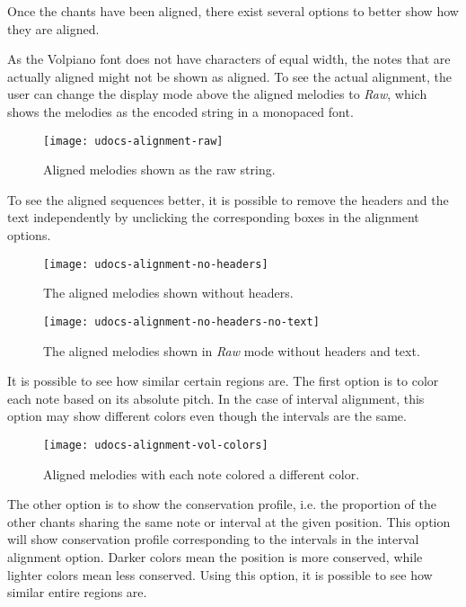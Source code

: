 Once the chants have been aligned, there exist several options to better show how they are aligned.

As the Volpiano font does not have characters of equal width, the notes that are actually aligned might not be shown as aligned. To see the
actual alignment, the user can change the display mode above the aligned melodies to \emph{Raw}, which shows the melodies as the encoded string
in a monopaced font.

\begin{figure}[h]
\centering
\texttt{[image: udocs-alignment-raw]}
\caption{Aligned melodies shown as the raw string.}
\label{fig:align-raw}
\end{figure}

To see the aligned sequences better, it is possible to remove the headers and the text independently by unclicking the corresponding boxes
in the alignment options.

\begin{figure}[h]
\centering
\texttt{[image: udocs-alignment-no-headers]}
\caption{The aligned melodies shown without headers.}
\label{fig:align-no-headers}
\end{figure}

\begin{figure}[h]
\centering
\texttt{[image: udocs-alignment-no-headers-no-text]}
\caption{The aligned melodies shown in \emph{Raw} mode without headers and text.}
\label{fig:align-no-text}
\end{figure}

It is possible to see how similar certain regions are. The first option is to color each note based on its absolute pitch. In the case of interval alignment,
this option may show different colors even though the intervals are the same.

\begin{figure}[h]
\centering
\texttt{[image: udocs-alignment-vol-colors]}
\caption{Aligned melodies with each note colored a different color.}
\label{fig:align-colors}
\end{figure}

The other option is to show the conservation profile, i.e. the proportion of the other chants sharing the same note or interval at the given position. This option will show
conservation profile corresponding to the intervals in the interval alignment option. Darker colors mean the position is more conserved, while lighter colors mean less conserved.
Using this option, it is possible to see how similar entire regions are.

